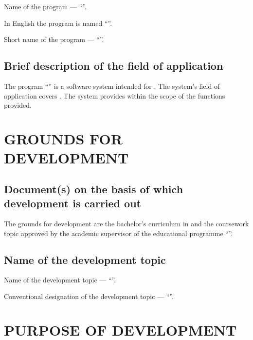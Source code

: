 \documentclass[12pt,a4paper]{extarticle}
\begin{document}
Name of the program --- \enquote{\projectname}.

In English the program is named \enquote{\hseProjectNameEn}.

Short name of the program --- \enquote{\hseProjectNameShort}.

\subsection{Brief description of the field of application}

The program \enquote{\projectname} is a software system intended for . The system's field of application covers . The system provides  within the scope of the functions provided.

\clearpage

\section{GROUNDS FOR DEVELOPMENT}

\subsection{Document(s) on the basis of which development is carried out}

The grounds for development are the bachelor's curriculum in  and the coursework topic approved by the academic supervisor of the educational programme \enquote{\hseSpecialization}.

\subsection{Name of the development topic}

Name of the development topic --- \enquote{\projectname}.

Conventional designation of the development topic --- \enquote{}.

\clearpage

\section{PURPOSE OF DEVELOPMENT}
\end{document}
